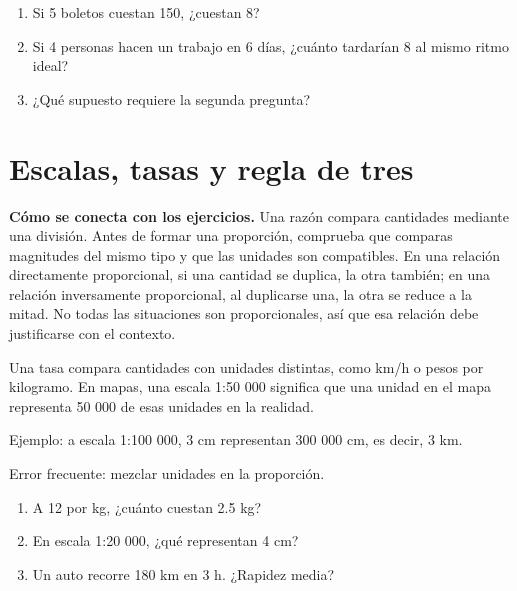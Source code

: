 \documentclass[10pt,oneside,openany]{book}
\begin{document}
\begin{practica}

\begin{enumerate}

\item Si 5 boletos cuestan \textdollar{}150, ¿cuestan 8?

\item Si 4 personas hacen un trabajo en 6 días, ¿cuánto tardarían 8 al mismo ritmo ideal?

\item ¿Qué supuesto requiere la segunda pregunta?

\end{enumerate}

\end{practica}



\section{Escalas, tasas y regla de tres}

\textbf{Cómo se conecta con los ejercicios.} Una razón compara cantidades mediante una división. Antes de formar una proporción, comprueba que comparas magnitudes del mismo tipo y que las unidades son compatibles. En una relación directamente proporcional, si una cantidad se duplica, la otra también; en una relación inversamente proporcional, al duplicarse una, la otra se reduce a la mitad. No todas las situaciones son proporcionales, así que esa relación debe justificarse con el contexto.

Una tasa compara cantidades con unidades distintas, como km/h o pesos por kilogramo. En mapas, una escala 1:50 000 significa que una unidad en el mapa representa 50 000 de esas unidades en la realidad.

\begin{ejemplo}
Ejemplo: a escala 1:100 000, 3 cm representan 300 000 cm, es decir, 3 km.
\end{ejemplo}

\begin{ojo}
Error frecuente: mezclar unidades en la proporción.
\end{ojo}

\begin{practica}

\begin{enumerate}

\item A \textdollar{}12 por kg, ¿cuánto cuestan 2.5 kg?

\item En escala 1:20 000, ¿qué representan 4 cm?

\item Un auto recorre 180 km en 3 h. ¿Rapidez media?

\end{enumerate}

\end{practica}
\end{document}

